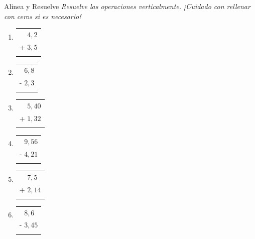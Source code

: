 \documentclass[12pt, letterpaper]{article}
\newcommand{\boxfill}[1][1.2cm]{\tcbox[on line, size=minimal, colframe=valdark!80, colback=white, boxrule=0.5pt, arc=1mm, boxsep=2pt, left=2pt, right=2pt, top=2pt, bottom=2pt]{\makebox[#1]{\vphantom{M}}}}
\begin{document}
	\vspace{0.4cm}
	\begin{practica}{Alinea y Resuelve}
		\textit{Resuelve las operaciones verticalmente. ¡Cuidado con rellenar con ceros si es necesario!}
		
		\vspace{0.4cm}
		\begin{multicols}{3}
			\raggedcolumns
			\begin{enumerate}[itemsep=1cm]
				\item 
				\begin{tabular}{r}
					$4,2$ \\
					+ $3,5$ \\
					\hline
					\boxfill[1.5cm]
				\end{tabular}
				
				\item 
				\begin{tabular}{r}
					$6,8$ \\
					- $2,3$ \\
					\hline
					\boxfill[1.5cm]
				\end{tabular}
				
				\item 
				\begin{tabular}{r}
					$5,40$ \\
					+ $1,32$ \\
					\hline
					\boxfill[1.5cm]
				\end{tabular}
				
				\item 
				\begin{tabular}{r}
					$9,56$ \\
					- $4,21$ \\
					\hline
					\boxfill[1.5cm]
				\end{tabular}
				
				\item 
				\begin{tabular}{r}
					$7,5\phantom{0}$ \\
					+ $2,14$ \\
					\hline
					\boxfill[1.5cm]
				\end{tabular}
				
				\item 
				\begin{tabular}{r}
					$8,6\phantom{0}$ \\
					- $3,45$ \\
					\hline
					\boxfill[1.5cm]
				\end{tabular}
				

\end{enumerate}
\end{multicols}
\end{practica}
\end{document}
